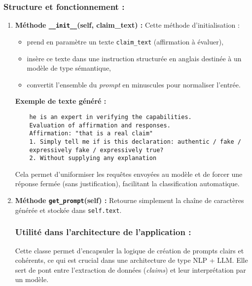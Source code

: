 \begin{description}
\begin{description}
\subsubsection*{Structure et fonctionnement :}

\begin{enumerate}
    \item \textbf{Méthode \texttt{\_\_init\_\_}(self, claim\_text) :}
    Cette méthode d'initialisation :
    \begin{itemize}
        \item prend en paramètre un texte \texttt{claim\_text} (affirmation à évaluer),
        \item insère ce texte dans une instruction structurée en anglais destinée à un modèle de type sémantique,
        \item convertit l'ensemble du \textit{prompt} en minuscules pour normaliser l'entrée.
    \end{itemize}

    \textbf{Exemple de texte généré :}
    \begin{verbatim}
    he is an expert in verifying the capabilities.
    Evaluation of affirmation and responses.
    Affirmation: "that is a real claim"
    1. Simply tell me if is this declaration: authentic / fake / 
    expressively fake / expressively true?
    2. Without supplying any explanation
    \end{verbatim}
    Cela permet d'uniformiser les requêtes envoyées au modèle et de forcer une réponse fermée (sans justification), facilitant la classification automatique.

    \item \textbf{Méthode \texttt{get\_prompt}(self) :} %
    Retourne simplement la chaîne de caractères générée et stockée dans \texttt{self.text}. %
    


\subsubsection*{\textbullet{} Utilité dans l'architecture de l'application :}
Cette classe permet d'encapsuler la logique de création de prompts clairs et cohérents, ce qui est crucial dans une architecture de type NLP + LLM. Elle sert de pont entre l'extraction de données (\textit{claims}) et leur interprétation par un modèle.
     

\end{enumerate}
\end{description}
\end{description}
